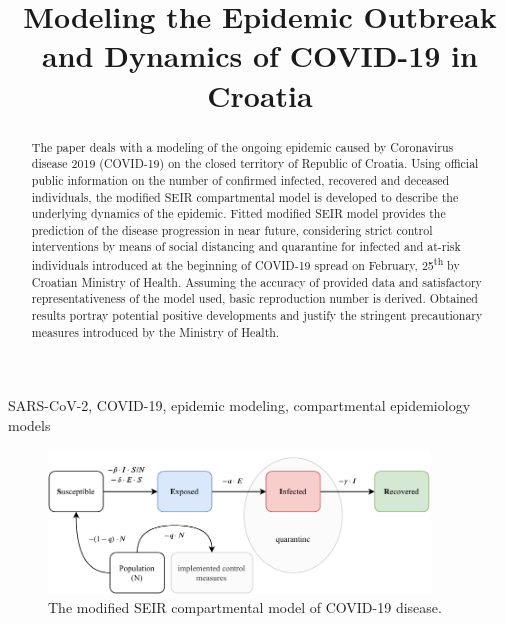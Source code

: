 \documentclass[conference]{IEEEtran}
\begin{document}
\title{Modeling the Epidemic Outbreak and Dynamics of COVID-19 in Croatia}
\author{
}

\maketitle

\begin{abstract}
\label{sec.abstract}
The paper deals with a modeling of the ongoing epidemic caused by Coronavirus disease 2019 (COVID-19) on the closed territory of Republic of Croatia. Using official public information on the number of confirmed infected, recovered and deceased individuals, the modified SEIR compartmental model is developed to describe the underlying dynamics of the epidemic. Fitted modified SEIR model provides the prediction of the disease progression in near future, considering strict control interventions by means of social distancing and quarantine for infected and at-risk individuals introduced at the beginning of COVID-19 spread on February, 25\textsuperscript{th} by Croatian Ministry of Health. Assuming the accuracy of provided data and satisfactory representativeness of the model used, basic reproduction number is derived. Obtained results portray potential positive developments and justify the stringent precautionary measures introduced by the Ministry of Health.
\end{abstract}
 
\begin{IEEEkeywords}
SARS-CoV-2, COVID-19, epidemic modeling, compartmental epidemiology models
\end{IEEEkeywords}

\begin{figure}[htb!]
    \centering
    \includegraphics[width=0.9\textwidth]{figs/model.pdf}
    \caption{The modified SEIR compartmental model of COVID-19 disease.}
    \label{fig.seir}
\end{figure}
\end{document}
